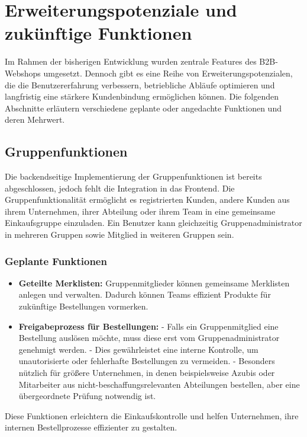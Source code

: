 \documentclass[%
	12pt,
	a4paper,
	oneside,
	parskip=full
]{scrbook}
\begin{document}
\chapter{Erweiterungspotenziale und zukünftige Funktionen}

Im Rahmen der bisherigen Entwicklung wurden zentrale Features des B2B-Webshops umgesetzt. Dennoch gibt es eine Reihe von Erweiterungspotenzialen, die die Benutzererfahrung verbessern, betriebliche Abläufe optimieren und langfristig eine stärkere Kundenbindung ermöglichen können. Die folgenden Abschnitte erläutern verschiedene geplante oder angedachte Funktionen und deren Mehrwert.

\section{Gruppenfunktionen}

Die backendseitige Implementierung der Gruppenfunktionen ist bereits abgeschlossen, jedoch fehlt die Integration in das Frontend. Die Gruppenfunktionalität ermöglicht es registrierten Kunden, andere Kunden aus ihrem Unternehmen, ihrer Abteilung oder ihrem Team in eine gemeinsame Einkaufsgruppe einzuladen. Ein Benutzer kann gleichzeitig Gruppenadministrator in mehreren Gruppen sowie Mitglied in weiteren Gruppen sein.

\subsection{Geplante Funktionen}
\begin{itemize}
	\item \textbf{Geteilte Merklisten:} Gruppenmitglieder können gemeinsame Merklisten anlegen und verwalten. Dadurch können Teams effizient Produkte für zukünftige Bestellungen vormerken.
	\item \textbf{Freigabeprozess für Bestellungen:}  
	- Falls ein Gruppenmitglied eine Bestellung auslösen möchte, muss diese erst vom Gruppenadministrator genehmigt werden.  
	- Dies gewährleistet eine interne Kontrolle, um unautorisierte oder fehlerhafte Bestellungen zu vermeiden.  
	- Besonders nützlich für größere Unternehmen, in denen beispielsweise Azubis oder Mitarbeiter aus nicht-beschaffungsrelevanten Abteilungen bestellen, aber eine übergeordnete Prüfung notwendig ist.
\end{itemize}

Diese Funktionen erleichtern die Einkaufskontrolle und helfen Unternehmen, ihre internen Bestellprozesse effizienter zu gestalten.
\end{document}
